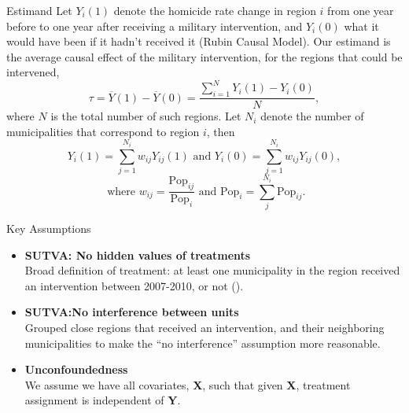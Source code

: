\documentclass[final]{beamer}
\newlength{\onecolwid}
\begin{document}
\begin{frame}[t]
\begin{columns}[t]
\begin{column}{\onecolwid}
      \begin{block}{Estimand}
        Let $Y_i(1)$ denote the homicide rate change in region $i$ from one year before to one year after receiving a military intervention, and $Y_i(0)$ what it would have been if it hadn't received it (Rubin Causal Model). Our estimand is the average causal effect of the military intervention, for the regions that could be intervened, $$\tau=\overline{Y}(1)-\overline{Y}(0)=\frac{ \sum_{i=1}^{N} Y_i(1)-Y_i(0)}{N},$$
where $N$ is the total number of such regions.
        Let $N_i$ denote the number of municipalities that correspond to region $i$, then 
	$$Y_i(1) = \sum_{j=1}^{N_i}w_{ij}Y_{ij}(1) \textrm{ and } Y_i(0) = \sum_{j=1}^{N_i}w_{ij}Y_{ij}(0),$$	
	$$\textrm{ where }  w_{ij}= \frac{\textrm{Pop}_{ij}}{\textrm{Pop}_{i}} \textrm{ and  }\textrm{Pop}_{i}= \sum_j^{N_i}\textrm{Pop}_{ij}.$$
      \end{block}
      \begin{block}{Key Assumptions}
        {\small 
        \begin{itemize}
          \item \textbf{SUTVA: No hidden values of treatments}\\
            Broad definition of treatment: at least one municipality in the region received an intervention between 2007-2010, or not (\cite{NEXOS}).
          \item \textbf{SUTVA:No interference between units} \\
             Grouped close regions that received an intervention, and their neighboring municipalities to make the ``no interference'' assumption  more reasonable. %
        \item \textbf{Unconfoundedness} \\
           We assume we have all covariates, \textbf{X}, such that given \textbf{X},  treatment assignment is independent of \textbf{Y}.

\end{itemize}}
\end{block}
\end{column}
\end{columns}
\end{frame}
\end{document}
